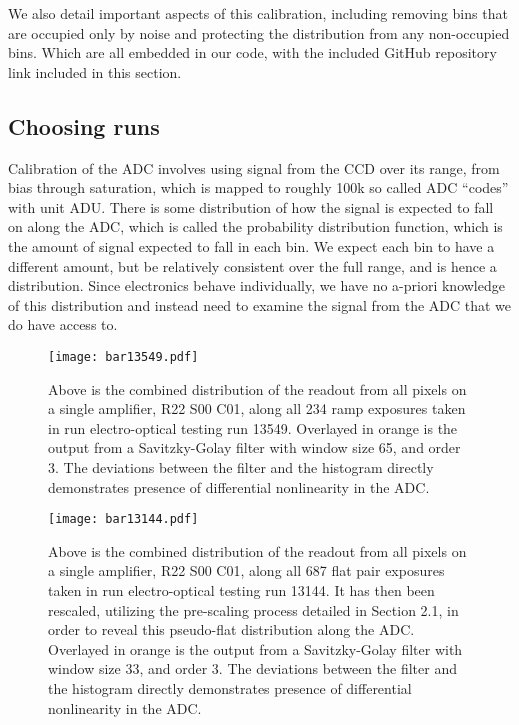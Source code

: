 \documentclass[11pt, letterpaper]{article}
\begin{document}
We also detail important aspects of this calibration, including removing bins that are occupied only by noise and protecting the distribution from any non-occupied bins. 
Which are all embedded in our code, with the included GitHub repository link included in this section. 

\subsection{Choosing runs}
\indent


Calibration of the ADC involves using signal from the CCD over its range, from bias through saturation, which is mapped to roughly 100k so called ADC “codes” with unit ADU. 
There is some distribution of how the signal is expected to fall on along the ADC, which is called the probability distribution function, which is the amount of signal expected to fall in each bin. 
We expect each bin to have a different amount, but be relatively consistent over the full range, and is hence a distribution. 
Since electronics behave individually, we have no a-priori knowledge of this distribution and instead need to examine the signal from the ADC that we do have access to. 
\indent 

\begin{figure}
	\texttt{[image: bar13549.pdf]}
	\caption{Above is the combined distribution of the readout from all pixels on a single amplifier, R22 S00 C01, along all 234 ramp exposures taken in run electro-optical testing run 13549. Overlayed in orange is the output from a Savitzky-Golay filter with window size 65, and order 3. The deviations between the filter and the histogram directly 				demonstrates presence of differential nonlinearity in the ADC.}
\end{figure}


\begin{figure}
	\texttt{[image: bar13144.pdf]}
	\caption{Above is the combined distribution of the readout from all pixels on a single amplifier, R22 S00 C01, along all 687 flat pair exposures taken in run electro-optical testing 	run 13144. It has then been rescaled, utilizing the pre-scaling process detailed in Section 2.1, in order to reveal this pseudo-flat distribution along the ADC. Overlayed in orange is the output from a Savitzky-Golay filter with window size 33, and order 3. The deviations between the filter and the histogram directly demonstrates presence of differential nonlinearity in the ADC.}
\end{figure}
\end{document}
